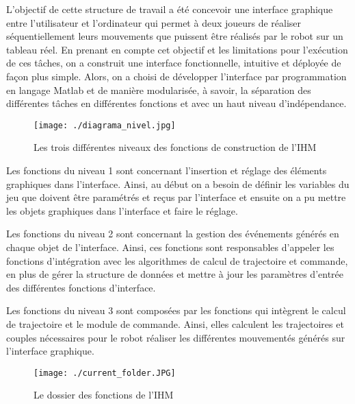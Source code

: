 
L'objectif de cette structure de travail a été concevoir une interface graphique entre l'utilisateur et l'ordinateur qui permet à deux joueurs de réaliser séquentiellement leurs mouvements que puissent être réalisés par le robot sur un tableau réel. En prenant en compte cet objectif et les limitations pour l'exécution de ces tâches, on a construit une interface fonctionnelle, intuitive et déployée de façon plus simple. Alors, on a choisi de développer l'interface par programmation en langage Matlab et de manière modularisée, à savoir, la séparation des différentes tâches en différentes fonctions et avec un haut niveau d'indépendance.
\vspace{3pt}
\begin{figure}[H]
	\begin{center}	
		\captionsetup{justification=centering,margin=1cm}
		\texttt{[image: ./diagrama\_nivel.jpg]}
		\caption{Les trois différentes niveaux des fonctions de construction de l’IHM}
		\label{fig:diagrama_nivel}
	\end{center}
\end{figure}

Les fonctions du niveau 1 sont concernant l'insertion et réglage des éléments graphiques dans l’interface. Ainsi, au début on a besoin de définir les variables du jeu que doivent être paramétrés et reçus par l’interface et ensuite on a pu mettre les objets graphiques dans l’interface et faire le réglage. 
 
Les fonctions du niveau 2 sont concernant la gestion des événements générés en chaque objet de l’interface. Ainsi, ces fonctions sont responsables d’appeler les fonctions d'intégration avec les algorithmes de calcul de trajectoire et commande, en plus de gérer la structure de données et mettre à jour les paramètres d’entrée des différentes fonctions d’interface.
 
Les fonctions du niveau 3 sont composées par les fonctions qui intègrent le calcul de trajectoire et le module de commande. Ainsi, elles calculent les trajectoires et couples nécessaires pour le robot réaliser les différentes mouvementés générés sur l’interface graphique.
\pagebreak

\begin{figure}[H]
	\begin{center}
		\captionsetup{justification=centering,margin=1cm}	
		\texttt{[image: ./current\_folder.JPG]}
		\caption{Le dossier des fonctions de l’IHM}
		\label{fig:folder}
	\end{center}
\end{figure}

